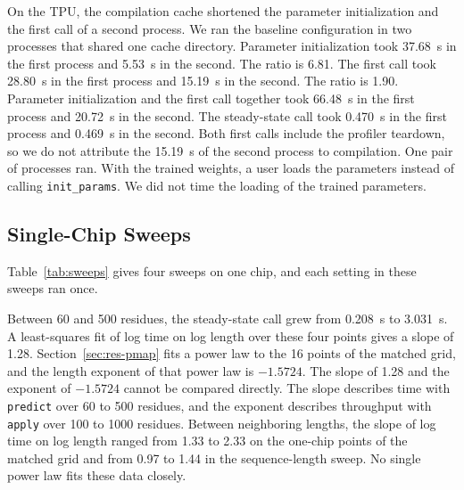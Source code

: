 On the TPU, the compilation cache shortened the parameter initialization and the first call of a second process.
We ran the baseline configuration in two processes that shared one cache directory.
Parameter initialization took 37.68~s in the first process and 5.53~s in the second. The ratio is 6.81. %
The first call took 28.80~s in the first process and 15.19~s in the second. The ratio is 1.90. %
Parameter initialization and the first call together took 66.48~s in the first process and 20.72~s in the second. %
The steady-state call took 0.470~s in the first process and 0.469~s in the second. %
Both first calls include the profiler teardown, so we do not attribute the 15.19~s of the second process to compilation. %
One pair of processes ran. With the trained weights, a user loads the parameters instead of calling
\texttt{init\_params}. We did not time the loading of the trained parameters.

\subsection{Single-Chip Sweeps}\label{sec:res-sweeps}
\begin{table}[t]
\caption{\capTabSweeps}\label{tab:sweeps}
\centering\small{}
\end{table}

Table~\ref{tab:sweeps} gives four sweeps on one chip, and each setting in these sweeps ran once.

Between 60 and 500 residues, the steady-state call grew from 0.208~s to 3.031~s. %
A least-squares fit of log time on log length over these four points gives a slope of 1.28. %
Section~\ref{sec:res-pmap} fits a power law to the 16 points of the matched grid, and the length exponent of that power law is $-1.5724$. The slope of 1.28 and the exponent of $-1.5724$ cannot be compared directly. The slope describes time with \texttt{predict} over 60 to 500 residues, and the exponent describes throughput with \texttt{apply} over 100 to 1000 residues. %
Between neighboring lengths, the slope of log time on log length ranged from 1.33 to 2.33 on the one-chip points of the matched grid and from 0.97 to 1.44 in the sequence-length sweep. %
No single power law fits these data closely.

